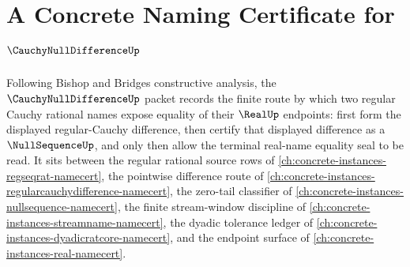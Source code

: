 \chapter{A Concrete Naming Certificate for $\CauchyNullDifferenceUp$}
\label{ch:concrete-instances-cauchy-null-difference-namecert}

Following Bishop and Bridges constructive analysis, the $\CauchyNullDifferenceUp$ packet records the finite route by which two regular Cauchy rational names expose equality of their $\RealUp$ endpoints: first form the displayed regular-Cauchy difference, then certify that displayed difference as a $\NullSequenceUp$, and only then allow the terminal real-name equality seal to be read. It sits between the regular rational source rows of \autoref{ch:concrete-instances-regseqrat-namecert}, the pointwise difference route of \autoref{ch:concrete-instances-regularcauchydifference-namecert}, the zero-tail classifier of \autoref{ch:concrete-instances-nullsequence-namecert}, the finite stream-window discipline of \autoref{ch:concrete-instances-streamname-namecert}, the dyadic tolerance ledger of \autoref{ch:concrete-instances-dyadicratcore-namecert}, and the endpoint surface of \autoref{ch:concrete-instances-real-namecert}.

